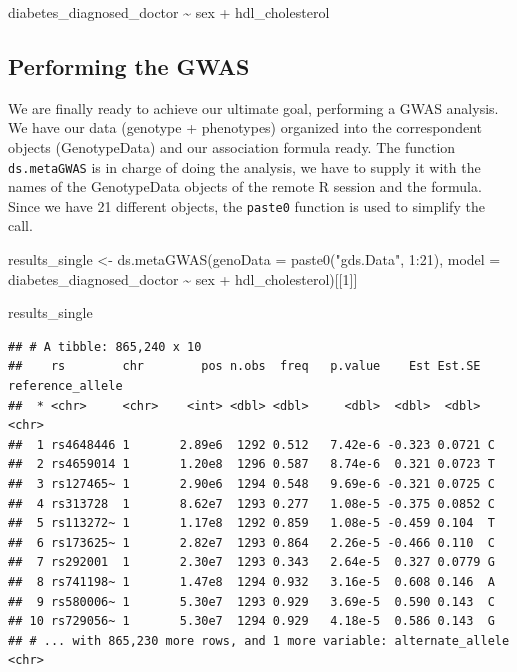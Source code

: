 \documentclass[
]{book}
\newenvironment{Shaded}{\begin{snugshade}}{\end{snugshade}}
\newcommand{\AttributeTok}[1]{\textcolor[rgb]{0.77,0.63,0.00}{#1}}
\newcommand{\DecValTok}[1]{\textcolor[rgb]{0.00,0.00,0.81}{#1}}
\newcommand{\FunctionTok}[1]{\textcolor[rgb]{0.00,0.00,0.00}{#1}}
\newcommand{\NormalTok}[1]{#1}
\newcommand{\OtherTok}[1]{\textcolor[rgb]{0.56,0.35,0.01}{#1}}
\newcommand{\SpecialCharTok}[1]{\textcolor[rgb]{0.00,0.00,0.00}{#1}}
\newcommand{\StringTok}[1]{\textcolor[rgb]{0.31,0.60,0.02}{#1}}
\begin{document}
\begin{Shaded}
\begin{Highlighting}[]
\NormalTok{diabetes\_diagnosed\_doctor }\SpecialCharTok{\textasciitilde{}}\NormalTok{ sex }\SpecialCharTok{+}\NormalTok{ hdl\_cholesterol}
\end{Highlighting}
\end{Shaded}

\hypertarget{performing-the-gwas}{%
\subsection{Performing the GWAS}\label{performing-the-gwas}}

We are finally ready to achieve our ultimate goal, performing a GWAS analysis. We have our data (genotype + phenotypes) organized into the correspondent objects (GenotypeData) and our association formula ready. The function \texttt{ds.metaGWAS} is in charge of doing the analysis, we have to supply it with the names of the GenotypeData objects of the remote R session and the formula. Since we have 21 different objects, the \texttt{paste0} function is used to simplify the call.

\begin{Shaded}
\begin{Highlighting}[]
\NormalTok{results\_single }\OtherTok{\textless{}{-}} \FunctionTok{ds.metaGWAS}\NormalTok{(}\AttributeTok{genoData =} \FunctionTok{paste0}\NormalTok{(}\StringTok{"gds.Data"}\NormalTok{, }\DecValTok{1}\SpecialCharTok{:}\DecValTok{21}\NormalTok{), }\AttributeTok{model =}\NormalTok{ diabetes\_diagnosed\_doctor }\SpecialCharTok{\textasciitilde{}}\NormalTok{ sex }\SpecialCharTok{+}\NormalTok{ hdl\_cholesterol)[[}\DecValTok{1}\NormalTok{]]}

\NormalTok{results\_single}
\end{Highlighting}
\end{Shaded}

\begin{verbatim}
## # A tibble: 865,240 x 10
##    rs        chr        pos n.obs  freq   p.value    Est Est.SE reference_allele
##  * <chr>     <chr>    <int> <dbl> <dbl>     <dbl>  <dbl>  <dbl> <chr>           
##  1 rs4648446 1       2.89e6  1292 0.512   7.42e-6 -0.323 0.0721 C               
##  2 rs4659014 1       1.20e8  1296 0.587   8.74e-6  0.321 0.0723 T               
##  3 rs127465~ 1       2.90e6  1294 0.548   9.69e-6 -0.321 0.0725 C               
##  4 rs313728  1       8.62e7  1293 0.277   1.08e-5 -0.375 0.0852 C               
##  5 rs113272~ 1       1.17e8  1292 0.859   1.08e-5 -0.459 0.104  T               
##  6 rs173625~ 1       2.82e7  1293 0.864   2.26e-5 -0.466 0.110  C               
##  7 rs292001  1       2.30e7  1293 0.343   2.64e-5  0.327 0.0779 G               
##  8 rs741198~ 1       1.47e8  1294 0.932   3.16e-5  0.608 0.146  A               
##  9 rs580006~ 1       5.30e7  1293 0.929   3.69e-5  0.590 0.143  C               
## 10 rs729056~ 1       5.30e7  1294 0.929   4.18e-5  0.586 0.143  G               
## # ... with 865,230 more rows, and 1 more variable: alternate_allele <chr>
\end{verbatim}
\end{document}
